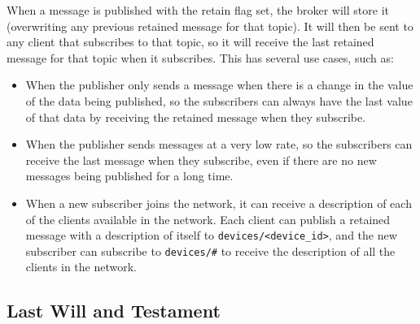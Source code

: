 When a message is published with the retain flag set, the broker will store it (overwriting any previous retained message for that topic). It will then be sent to any client that subscribes to that topic, so it will receive the last retained message for that topic when it subscribes. This has several use cases, such as:
\begin{itemize}
    \item When the publisher only sends a message when there is a change in the value of the data being published, so the subscribers can always have the last value of that data by receiving the retained message when they subscribe.
    \item When the publisher sends messages at a very low rate, so the subscribers can receive the last message when they subscribe, even if there are no new messages being published for a long time.
    \item When a new subscriber joins the network, it can receive a description of each of the clients available in the network. Each client can publish a retained message with a description of itself to \texttt{devices/<device\_id>}, and the new subscriber can subscribe to \texttt{devices/\#} to receive the description of all the clients in the network.
\end{itemize}

\subsection{Last Will and Testament}

